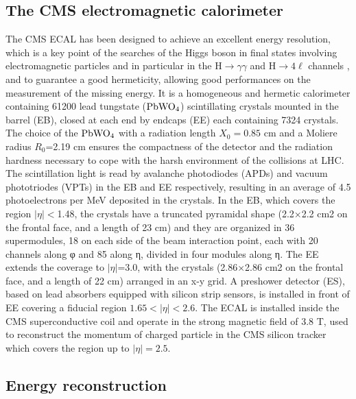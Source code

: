 \documentclass[journal]{IEEEtran}
\begin{document}
\subsection{The CMS electromagnetic calorimeter}
The CMS ECAL \cite{CMS:1997ema} has been designed to achieve an excellent energy resolution, which is a key point of the searches of the Higgs boson in final states involving electromagnetic particles and in particular in the H$\to\gamma\gamma$ \cite{Khachatryan:2014ira} and H$\to4\ell$ channels \cite{Chatrchyan:2013mxa}, and to guarantee a good hermeticity, allowing good performances on the measurement of the missing energy.
It is a homogeneous and hermetic calorimeter containing 61200 lead tungstate ($\rm PbWO_4$) scintillating crystals mounted in the barrel (EB), closed at each end by endcaps (EE) each containing 7324 crystals. The choice of the $\rm PbWO_4$ with a radiation length $X_0=0.85$ cm and a Moliere radius $R_0$=2.19 cm ensures the compactness of the detector and the radiation hardness necessary to cope with the harsh environment of the collisions at LHC. The scintillation light is read by avalanche photodiodes (APDs) and vacuum phototriodes (VPTs) in the EB and EE
respectively, resulting in an average of 4.5 photoelectrons per MeV deposited in the crystals. In the EB, which covers the region $\vert\eta\vert<$1.48, the crystals have a truncated pyramidal shape (2.2×2.2 cm2 on the frontal face, and a length of 23 cm) and they are organized in 36 supermodules, 18 on each side of the beam interaction point, each with 20 channels along φ and 85 along η, divided in four modules along η. The EE extends the coverage to $\vert\eta\vert$=3.0, with the crystals (2.86×2.86 cm2 on the frontal face, and a length of 22 cm) arranged in an x-y grid. A preshower detector (ES), based on lead absorbers equipped with silicon strip sensors, is installed in front of EE covering a fiducial region $1.65<\vert\eta\vert<2.6$.
The ECAL is installed inside the CMS superconductive coil and operate in the strong magnetic field of 3.8 T, used to reconstruct the momentum of charged particle in the CMS silicon tracker which covers the region up to $\vert\eta\vert=2.5$.



\subsection{Energy reconstruction}
\end{document}
